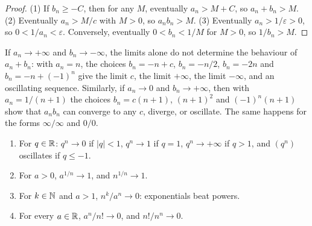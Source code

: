 \begin{proof}
(1) If $b_n \geq -C$, then for any $M$, eventually $a_n > M + C$, so $a_n + b_n > M$. (2) Eventually $a_n > M/c$ with $M > 0$, so $a_nb_n > M$. (3) Eventually $a_n > 1/\varepsilon > 0$, so
$0 < 1/a_n < \varepsilon$. Conversely, eventually $0 < b_n < 1/M$ for $M > 0$, so $1/b_n > M$.
\end{proof}

\begin{counterexample}\label{real-analysis:counterexample-indeterminate}
If $a_n \to +\infty$ and $b_n \to -\infty$, the limits alone do not determine the behaviour of $a_n + b_n$: with $a_n = n$, the choices $b_n = -n + c$, $b_n = -n/2$, $b_n = -2n$ and $b_n = -n + (-1)^n$ give
the limit $c$, the limit $+\infty$, the limit $-\infty$, and an oscillating sequence. Similarly, if $a_n \to 0$ and $b_n \to +\infty$, then with $a_n = 1/(n+1)$ the choices $b_n = c(n + 1)$, $(n + 1)^2$ and
$(-1)^n(n + 1)$ show that $a_nb_n$ can converge to any $c$, diverge, or oscillate. The same happens for the forms $\infty/\infty$ and $0/0$.
\end{counterexample}

\begin{proposition}\label{real-analysis:proposition-fundamental-limits}
\begin{enumerate}
\item For $q \in \mathbb{R}$: $q^n \to 0$ if $|q| < 1$, $q^n \to 1$ if $q = 1$, $q^n \to +\infty$ if $q > 1$, and $(q^n)$ oscillates if $q \leq -1$.
\item For $a > 0$, $a^{1/n} \to 1$, and $n^{1/n} \to 1$.
\item For $k \in \mathbb{N}$ and $a > 1$, $n^k/a^n \to 0$: exponentials beat powers.
\item For every $a \in \mathbb{R}$, $a^n/n! \to 0$, and $n!/n^n \to 0$.
\end{enumerate}
\end{proposition}

